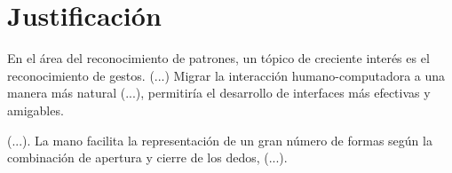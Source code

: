 \section*{Justificación}
En el área del reconocimiento de patrones, un tópico de creciente interés
es el reconocimiento de gestos. (...)
 Migrar la interacción humano-computadora
a una manera más natural (...), permitiría el desarrollo de interfaces más efectivas y amigables.

(...). La mano facilita la representación
de un gran número de formas según la combinación de apertura y cierre
de los dedos, (...).

